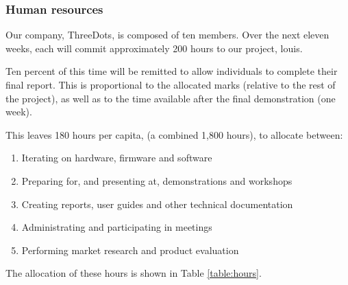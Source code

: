 \documentclass{article}
\begin{document}
\subsubsection{Human resources}

Our company, ThreeDots, is composed of ten members. Over the next eleven weeks, each will commit approximately 200 hours to our project, louis.

Ten percent of this time will be remitted to allow individuals to complete their final report. This is proportional to the allocated marks (relative to the rest of the project), as well as to the time available after the final demonstration (one week).

This leaves 180 hours per capita, (a combined 1,800 hours), to allocate between:
\begin{enumerate}
  \item Iterating on hardware, firmware and software
  \item Preparing for, and presenting at, demonstrations and workshops
  \item Creating reports, user guides and other technical documentation
  \item Administrating and participating in meetings
  \item Performing market research and product evaluation
\end{enumerate}

The allocation of these hours is shown in Table \ref{table:hours}.
\end{document}

